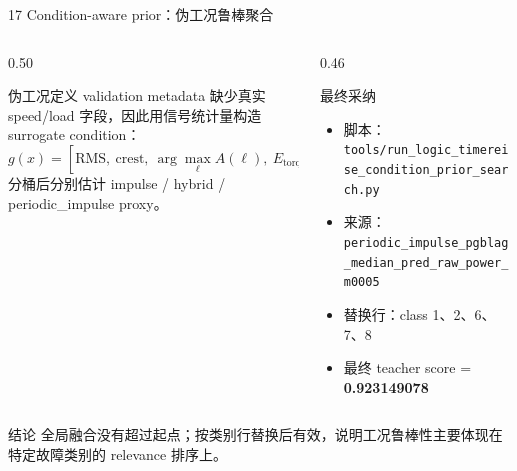\documentclass[aspectratio=169]{beamer}
\newcommand{\tightitems}{\setlength{\itemsep}{0.32em}}
\begin{document}
\begin{frame}{17 Condition-aware prior：伪工况鲁棒聚合}
    \small
    \begin{columns}[T,onlytextwidth]
        \begin{column}{0.50\textwidth}
            \begin{block}{伪工况定义}
                validation metadata 缺少真实 speed/load 字段，因此用信号统计量构造 surrogate condition：
                \[
                    g(x)=\left[
                    \mathrm{RMS},\ \mathrm{crest},\ \arg\max_\ell A(\ell),\
                    E_{\mathrm{torque}},\ E_{\mathrm{PGB}}
                    \right]
                \]
                分桶后分别估计 impulse / hybrid / periodic\_impulse proxy。
            \end{block}
        \end{column}
        \begin{column}{0.46\textwidth}
            \begin{block}{最终采纳}
                \begin{itemize}
                    \tightitems
                    \item 脚本：\texttt{tools/run\_logic\_timereise\_condition\_prior\_search.py}
                    \item 来源：\texttt{periodic\_impulse\_pgblag\_median\_pred\_raw\_power\_m0005}
                    \item 替换行：class 1、2、6、7、8
                    \item 最终 teacher score = \textbf{0.923149078}
                \end{itemize}
            \end{block}
        \end{column}
    \end{columns}
    \begin{block}{结论}
        全局融合没有超过起点；按类别行替换后有效，说明工况鲁棒性主要体现在特定故障类别的 relevance 排序上。
    \end{block}
\end{frame}
\end{document}
